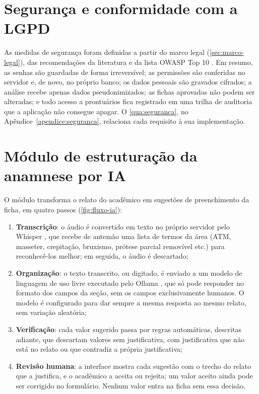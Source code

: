 \section{Segurança e conformidade com a LGPD}
\label{sec:seguranca}

As medidas de segurança foram definidas a partir do marco legal (\autoref{sec:marco-legal}), das recomendações da literatura \cite{shojaei2024,tertulino2023} e da lista OWASP Top 10 \cite{owasp-top10}. Em resumo, as senhas são guardadas de forma irreversível; as permissões são conferidas no servidor e, de novo, no próprio banco; os dados pessoais são gravados cifrados; a análise recebe apenas dados pseudonimizados; as fichas aprovadas não podem ser alteradas; e todo acesso a prontuários fica registrado em uma trilha de auditoria que a aplicação não consegue apagar. O \autoref{qua:seguranca}, no Apêndice~\ref{apendice:seguranca}, relaciona cada requisito à sua implementação.

\section{Módulo de estruturação da anamnese por IA}
\label{sec:metodo-ia}

O módulo transforma o relato do acadêmico em sugestões de preenchimento da ficha, em quatro passos (\autoref{fig:fluxo-ia}):

\begin{enumerate}
	\item \textbf{Transcrição}: o áudio é convertido em texto no próprio servidor pelo Whisper \cite{fasterwhisper}, que recebe de antemão uma lista de termos da área (ATM, masseter, crepitação, bruxismo, prótese parcial removível etc.) para reconhecê-los melhor; em seguida, o áudio é descartado;
	\item \textbf{Organização}: o texto transcrito, ou digitado, é enviado a um modelo de linguagem de uso livre executado pelo Ollama \cite{ollama}, que só pode responder no formato dos campos da seção, sem os campos exclusivamente humanos. O modelo é configurado para dar sempre a mesma resposta ao mesmo relato, sem variação aleatória;
	\item \textbf{Verificação}: cada valor sugerido passa por regras automáticas, descritas adiante, que descartam valores sem justificativa, com justificativa que não está no relato ou que contradiz a própria justificativa;
	\item \textbf{Revisão humana}: a interface mostra cada sugestão com o trecho do relato que a justifica, e o acadêmico a aceita ou rejeita; um valor aceito ainda pode ser corrigido no formulário. Nenhum valor entra na ficha sem essa decisão.
\end{enumerate}

